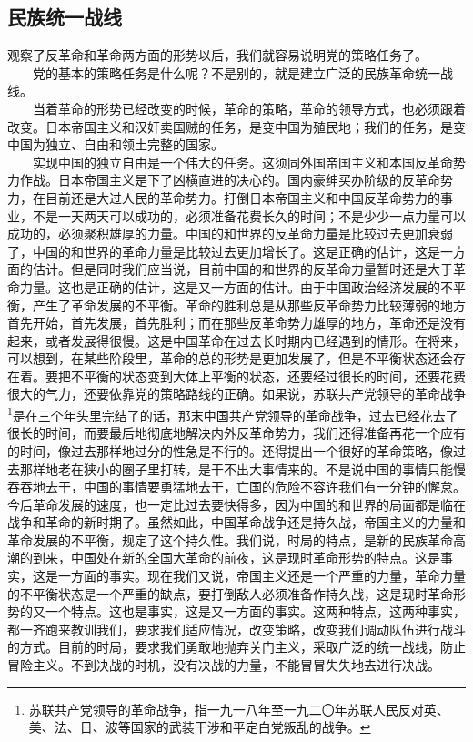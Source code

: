 \documentclass[cn,11pt,chinese]{elegantbook}
\def\myformat#1{\hfil\hfil #1}
\begin{document}
\subsection*{\myformat{民族统一战线}}
观察了反革命和革命两方面的形势以后，我们就容易说明党的策略任务了。\\
　　党的基本的策略任务是什么呢？不是别的，就是建立广泛的民族革命统一战线。\\
　　当着革命的形势已经改变的时候，革命的策略，革命的领导方式，也必须跟着改变。日本帝国主义和汉奸卖国贼的任务，是变中国为殖民地；我们的任务，是变中国为独立、自由和领土完整的国家。\\
　　实现中国的独立自由是一个伟大的任务。这须同外国帝国主义和本国反革命势力作战。日本帝国主义是下了凶横直进的决心的。国内豪绅买办阶级的反革命势力，在目前还是大过人民的革命势力。打倒日本帝国主义和中国反革命势力的事业，不是一天两天可以成功的，必须准备花费长久的时间；不是少少一点力量可以成功的，必须聚积雄厚的力量。中国的和世界的反革命力量是比较过去更加衰弱了，中国的和世界的革命力量是比较过去更加增长了。这是正确的估计，这是一方面的估计。但是同时我们应当说，目前中国的和世界的反革命力量暂时还是大于革命力量。这也是正确的估计，这是又一方面的估计。由于中国政治经济发展的不平衡，产生了革命发展的不平衡。革命的胜利总是从那些反革命势力比较薄弱的地方首先开始，首先发展，首先胜利；而在那些反革命势力雄厚的地方，革命还是没有起来，或者发展得很慢。这是中国革命在过去长时期内已经遇到的情形。在将来，可以想到，在某些阶段里，革命的总的形势是更加发展了，但是不平衡状态还会存在着。要把不平衡的状态变到大体上平衡的状态，还要经过很长的时间，还要花费很大的气力，还要依靠党的策略路线的正确。如果说，苏联共产党领导的革命战争\footnote[29]{ 苏联共产党领导的革命战争，指一九一八年至一九二〇年苏联人民反对英、美、法、日、波等国家的武装干涉和平定白党叛乱的战争。}是在三个年头里完结了的话，那末中国共产党领导的革命战争，过去已经花去了很长的时间，而要最后地彻底地解决内外反革命势力，我们还得准备再花一个应有的时间，像过去那样地过分的性急是不行的。还得提出一个很好的革命策略，像过去那样地老在狭小的圈子里打转，是干不出大事情来的。不是说中国的事情只能慢吞吞地去干，中国的事情要勇猛地去干，亡国的危险不容许我们有一分钟的懈怠。今后革命发展的速度，也一定比过去要快得多，因为中国的和世界的局面都是临在战争和革命的新时期了。虽然如此，中国革命战争还是持久战，帝国主义的力量和革命发展的不平衡，规定了这个持久性。我们说，时局的特点，是新的民族革命高潮的到来，中国处在新的全国大革命的前夜，这是现时革命形势的特点。这是事实，这是一方面的事实。现在我们又说，帝国主义还是一个严重的力量，革命力量的不平衡状态是一个严重的缺点，要打倒敌人必须准备作持久战，这是现时革命形势的又一个特点。这也是事实，这是又一方面的事实。这两种特点，这两种事实，都一齐跑来教训我们，要求我们适应情况，改变策略，改变我们调动队伍进行战斗的方式。目前的时局，要求我们勇敢地抛弃关门主义，采取广泛的统一战线，防止冒险主义。不到决战的时机，没有决战的力量，不能冒冒失失地去进行决战。\\
\end{document}
